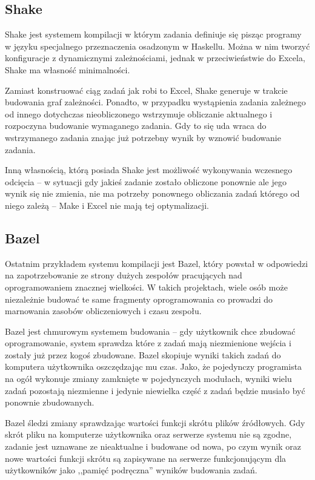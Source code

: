 \subsection{Shake}

Shake jest systemem kompilacji w którym zadania definiuje się pisząc programy w języku specjalnego przeznaczenia osadzonym w Haskellu. Można w nim tworzyć konfiguracje z dynamicznymi zależnościami, jednak w przeciwieństwie do Excela, Shake ma własność minimalności.

Zamiast konstruować ciąg zadań jak robi to Excel, Shake generuje w trakcie budowania graf zależności. Ponadto, w przypadku wystąpienia zadania zależnego od innego dotychczas nieobliczonego wstrzymuje obliczanie aktualnego i rozpoczyna budowanie wymaganego zadania. Gdy to się uda wraca do wstrzymanego zadania znając już potrzebny wynik by wznowić budowanie zadania.

Inną własnością, którą posiada Shake jest możliwość wykonywania wczesnego odcięcia -- w sytuacji gdy jakieś zadanie zostało obliczone ponownie ale jego wynik się nie zmienia, nie ma potrzeby ponownego obliczania zadań którego od niego zależą -- Make i Excel nie mają tej optymalizacji.

\subsection{Bazel}

Ostatnim przykładem systemu kompilacji jest Bazel, który powstał w odpowiedzi na zapotrzebowanie ze strony dużych zespołów pracujących nad oprogramowaniem znacznej wielkości. W takich projektach, wiele osób może niezależnie budować te same fragmenty oprogramowania co prowadzi do marnowania zasobów obliczeniowych i czasu zespołu.

Bazel jest chmurowym systemem budowania -- gdy użytkownik chce zbudować oprogramowanie, system sprawdza które z zadań mają niezmienione wejścia i zostały już przez kogoś zbudowane. Bazel skopiuje wyniki takich zadań do komputera użytkownika oszczędzając mu czas. Jako, że pojedynczy programista na ogół wykonuje zmiany zamknięte w pojedynczych modułach, wyniki wielu zadań pozostają niezmienne i jedynie niewielka część z zadań będzie musiało być ponownie zbudowanych.

Bazel śledzi zmiany sprawdzając wartości funkcji skrótu plików źródłowych. Gdy skrót pliku na komputerze użytkownika oraz serwerze systemu nie są zgodne, zadanie jest uznawane ze nieaktualne i budowane od nowa, po czym wynik oraz nowe wartości funkcji skrótu są zapisywane na serwerze funkcjonującym dla użytkowników jako ,,pamięć podręczna'' wyników budowania zadań.

